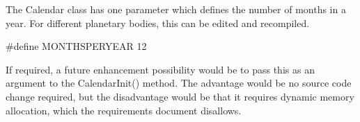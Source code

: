 
The Calendar class has one parameter which defines the number of months
in a year.  For different planetary bodies, this can be edited and
recompiled.

        \#define MONTHSPERYEAR 12

If required, a future enhancement possibility would be to pass this as an
argument to the CalendarInit() method.  The advantage would be no source
code change required, but the disadvantage would be that it requires
dynamic memory allocation, which the requirements document disallows.
